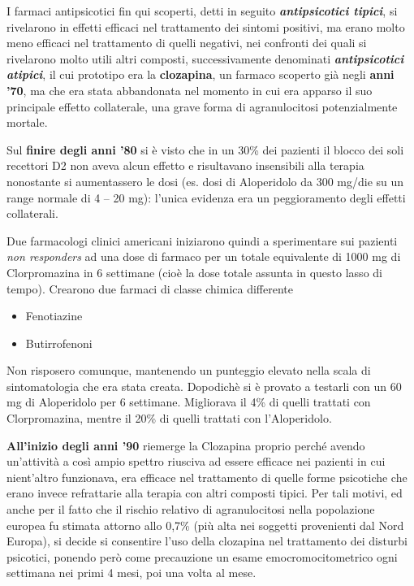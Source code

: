 I farmaci antipsicotici fin qui scoperti, detti in seguito
\textbf{\emph{antipsicotici tipici}}, si rivelarono in effetti efficaci
nel trattamento dei sintomi positivi, ma erano molto meno efficaci nel
trattamento di quelli negativi, nei confronti dei quali si rivelarono
molto utili altri composti, successivamente denominati
\textbf{\emph{antipsicotici atipici}}, il cui prototipo era la
\textbf{clozapina}, un farmaco scoperto già negli \textbf{anni '70}, ma
che era stata abbandonata nel momento in cui era apparso il suo
principale effetto collaterale, una grave forma di agranulocitosi
potenzialmente mortale.

Sul \textbf{finire degli anni '80} si è visto che in un 30\% dei
pazienti il blocco dei soli recettori D2 non aveva alcun effetto e
risultavano insensibili alla terapia nonostante si aumentassero le dosi
(es. dosi di Aloperidolo da 300 mg/die su un range normale di 4 -- 20
mg): l'unica evidenza era un peggioramento degli effetti collaterali.

Due farmacologi clinici americani iniziarono quindi a sperimentare sui
pazienti \emph{non responders} ad una dose di farmaco per un totale
equivalente di 1000 mg di Clorpromazina in 6 settimane (cioè la dose
totale assunta in questo lasso di tempo). Crearono due farmaci di classe
chimica differente

\begin{itemize}
\item
  Fenotiazine
\item
  Butirrofenoni
\end{itemize}

Non risposero comunque, mantenendo un punteggio elevato nella scala di
sintomatologia che era stata creata. Dopodichè si è provato a testarli
con un 60 mg di Aloperidolo per 6 settimane. Migliorava il 4\% di quelli
trattati con Clorpromazina, mentre il 20\% di quelli trattati con
l'Aloperidolo.

\textbf{All'inizio degli anni '90} riemerge la Clozapina proprio perché
avendo un'attività a così ampio spettro riusciva ad essere efficace nei
pazienti in cui nient'altro funzionava, era efficace nel trattamento di
quelle forme psicotiche che erano invece refrattarie alla terapia con
altri composti tipici. Per tali motivi, ed anche per il fatto che il
rischio relativo di agranulocitosi nella popolazione europea fu stimata
attorno allo 0,7\% (più alta nei soggetti provenienti dal Nord Europa),
si decide si consentire l'uso della clozapina nel trattamento dei
disturbi psicotici, ponendo però come precauzione un esame
emocromocitometrico ogni settimana nei primi 4 mesi, poi una volta al
mese.

